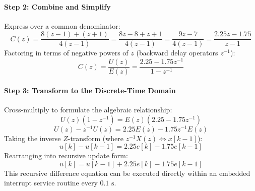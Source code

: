 \documentclass[12pt,onecolumn,twoside ]{article}
\begin{document}
	\paragraph{Step 2: Combine and Simplify}
	Express over a common denominator: \[
	C(z) = \frac{8(z - 1) + (z + 1)}{4(z - 1)} = \frac{8z - 8 + z + 1}{4(z - 1)} = \frac{9z - 7}{4(z - 1)} = \frac{2.25z - 1.75}{z - 1}
	\]
	Factoring in terms of negative powers of $z$ (backward delay operators $z^{-1}$): \[
	C(z) = \frac{U(z)}{E(z)} = \frac{2.25 - 1.75 z^{-1}}{1 - z^{-1}}
	\]
	\paragraph{Step 3: Transform to the Discrete-Time Domain}
	Cross-multiply to formulate the algebraic relationship: \[
	U(z) (1 - z^{-1}) = E(z) (2.25 - 1.75 z^{-1})
	\] \[
	U(z) - z^{-1} U(z) = 2.25 E(z) - 1.75 z^{-1} E(z)
	\]
	Taking the inverse $Z$-transform (where $z^{-1} X(z) \iff x[k-1]$): \[
	u[k] - u[k - 1] = 2.25 e[k] - 1.75 e[k - 1]
	\]
	Rearranging into recursive update form: \[
	u[k] = u[k - 1] + 2.25 e[k] - 1.75 e[k - 1]
	\] This recursive difference equation can be executed directly within an embedded interrupt service routine every $0.1\text{ s}$.
	
\end{document}
